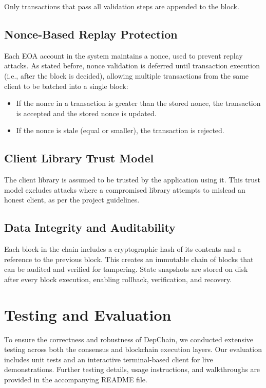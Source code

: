\documentclass[runningheads]{llncs}
\begin{document}
Only transactions that pass all validation steps are appended to the block.

\subsection{Nonce-Based Replay Protection}

Each EOA account in the system maintains a nonce, used to prevent replay attacks. As stated before, nonce validation is deferred until transaction execution (i.e., after the block is decided), allowing multiple transactions from the same client to be batched into a single block:
\begin{itemize}
    \item If the nonce in a transaction is greater than the stored nonce, the transaction is accepted and the stored nonce is updated.
    \item If the nonce is stale (equal or smaller), the transaction is rejected.
\end{itemize}

\subsection{Client Library Trust Model}

The client library is assumed to be trusted by the application using it. This trust model excludes attacks where a compromised library attempts to mislead an honest client, as per the project guidelines.

\subsection{Data Integrity and Auditability}

Each block in the chain includes a cryptographic hash of its contents and a reference to the previous block. This creates an immutable chain of blocks that can be audited and verified for tampering. State snapshots are stored on disk after every block execution, enabling rollback, verification, and recovery.

\section{Testing and Evaluation}

To ensure the correctness and robustness of DepChain, we conducted extensive testing across both the consensus and blockchain execution layers. Our evaluation includes unit tests and an interactive terminal-based client for live demonstrations. Further testing details, usage instructions, and walkthroughs are provided in the accompanying README file.
\end{document}

